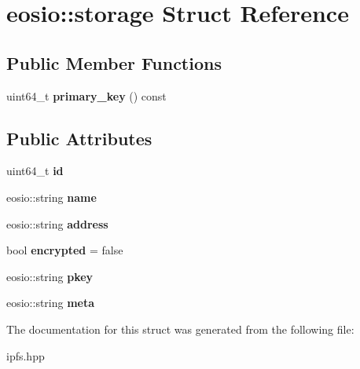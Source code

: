 \hypertarget{structeosio_1_1storage}{}\section{eosio\+:\+:storage Struct Reference}
\label{structeosio_1_1storage}
\subsection*{Public Member Functions}
\begin{DoxyCompactItemize}
\item 
\mbox{\label{structeosio_1_1storage_a4cb66fcdeb32a13c00ef525dab72e4c7}} 
uint64\+\_\+t {\bfseries primary\+\_\+key} () const
\end{DoxyCompactItemize}
\subsection*{Public Attributes}
\begin{DoxyCompactItemize}
\item 
\mbox{\label{structeosio_1_1storage_a077a3dc9253fdca202da008a754bbbd0}} 
uint64\+\_\+t {\bfseries id}
\item 
\mbox{\label{structeosio_1_1storage_a8cdfb756bd5f940332e5881a49677acf}} 
eosio\+::string {\bfseries name}
\item 
\mbox{\label{structeosio_1_1storage_ae01e594f27f65477508d3d0ea27b5b81}} 
eosio\+::string {\bfseries address}
\item 
\mbox{\label{structeosio_1_1storage_a317bd2459fe082ff647a9ab9c3e15254}} 
bool {\bfseries encrypted} = false
\item 
\mbox{\label{structeosio_1_1storage_a9327b58d87b17ec2dcf1019ad5a475b8}} 
eosio\+::string {\bfseries pkey}
\item 
\mbox{\label{structeosio_1_1storage_a09aa35e49f263a6139e0060ff737ab2d}} 
eosio\+::string {\bfseries meta}
\end{DoxyCompactItemize}


The documentation for this struct was generated from the following file\+:\begin{DoxyCompactItemize}
\item 
ipfs.\+hpp\end{DoxyCompactItemize}
